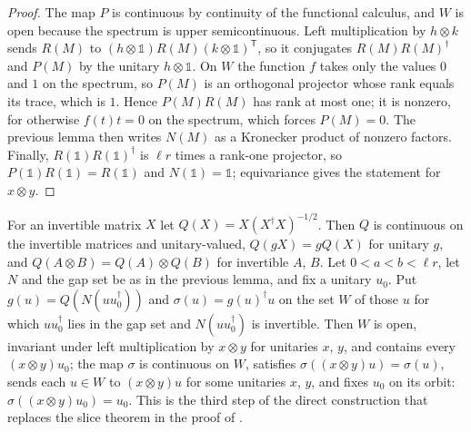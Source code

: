 \begin{proof}\leanok
    The map $P$ is continuous by continuity of the functional calculus, and
    $W$ is open because the spectrum is upper semicontinuous. Left
    multiplication by $h\otimes k$ sends $R(M)$ to
    $(h\otimes\mathbb 1)R(M)(k\otimes\mathbb 1)^{\mathsf T}$, so it conjugates
    $R(M)R(M)^\dagger$ and $P(M)$ by the unitary $h\otimes\mathbb 1$. On $W$ the
    function $f$ takes only the values $0$ and $1$ on the spectrum, so $P(M)$ is
    an orthogonal projector whose rank equals its trace, which is $1$. Hence
    $P(M)R(M)$ has rank at most one; it is nonzero, for otherwise
    $f(t)t=0$ on the spectrum, which forces $P(M)=0$. The previous lemma then
    writes $N(M)$ as a Kronecker product of nonzero factors. Finally,
    $R(\mathbb 1)R(\mathbb 1)^\dagger$ is $\ell r$ times a rank-one projector,
    so $P(\mathbb 1)R(\mathbb 1)=R(\mathbb 1)$ and $N(\mathbb 1)=\mathbb 1$; equivariance
    gives the statement for $x\otimes y$.
\end{proof}

\begin{lemma}
    \label{lem:kronecker_local_section}
    \leanok
    For an invertible matrix $X$ let $Q(X)=X(X^\dagger X)^{-1/2}$. Then $Q$ is
    continuous on the invertible matrices and unitary-valued, $Q(gX)=gQ(X)$ for
    unitary $g$, and $Q(A\otimes B)=Q(A)\otimes Q(B)$ for invertible $A$, $B$.
    Let $0<a<b<\ell r$, let $N$ and the gap set be as in the previous lemma, and
    fix a unitary $u_0$. Put $g(u)=Q(N(uu_0^\dagger))$ and
    $\sigma(u)=g(u)^\dagger u$ on the set $W$ of those $u$ for which $uu_0^\dagger$
    lies in the gap set and $N(uu_0^\dagger)$ is invertible. Then $W$ is open,
    invariant under left multiplication by $x\otimes y$ for unitaries $x$, $y$,
    and contains every $(x\otimes y)u_0$; the map $\sigma$ is continuous on
    $W$, satisfies $\sigma((x\otimes y)u)=\sigma(u)$, sends each $u\in W$ to
    $(x\otimes y)u$ for some unitaries $x$, $y$, and fixes $u_0$ on its orbit:
    $\sigma((x\otimes y)u_0)=u_0$. This is the third step of the direct
    construction that replaces the slice theorem in the proof of
    \cite[Corollary~IV.7]{Cirac2017MPU}.
\end{lemma}

